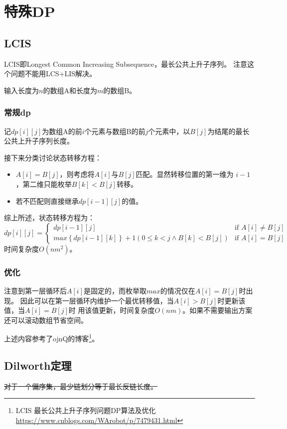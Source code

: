 \section{特殊DP}
\subsection{LCIS}
LCIS即Longest Common Increasing Subsequence，最长公共上升子序列。
注意这个问题不能用LCS+LIS解决。

输入长度为$n$的数组A和长度为$m$的数组B。
\subsubsection{常规dp}
记$dp[i][j]$为数组A的前$i$个元素与数组B的前$j$个元素中，以$B[j]$为结尾的最长
公共上升子序列长度。

接下来分类讨论状态转移方程：
\begin{itemize}
    \item $A[i]=B[j]$，则考虑将$A[i]$与$B[j]$匹配。显然转移位置的第一维为
    $i-1$，第二维只能枚举$B[k]<B[j]$转移。
    \item 若不匹配则直接继承$dp[i-1][j]$的值。
\end{itemize}

综上所述，状态转移方程为：
\begin{displaymath}
    dp[i][j]=\left\{\begin{array}{lr}
        dp[i-1][j]&\textrm{if~}A[i]\neq B[j]\\
        max\left\{dp[i-1][k]\right\}+1 (0\leq k <j \wedge B[k]<B[j])&
        \textrm{if~}A[i]=B[j]
    \end{array}\right.
\end{displaymath}
时间复杂度$O(nm^2)$。
\subsubsection{优化}
注意到第一层循环后$A[i]$是固定的，而枚举取$max$的情况仅在$A[i]=B[j]$时出现。
因此可以在第一层循环内维护一个最优转移值，当$A[i]>B[j]$时更新该值，当$A[i]=B[j]$时
用该值更新，时间复杂度$O(nm)$。如果不需要输出方案还可以滚动数组节省空间。

上述内容参考了ojnQ的博客\footnote{
    LCIS 最长公共上升子序列问题DP算法及优化
    \url{https://www.cnblogs.com/WArobot/p/7479431.html}
}。
\subsection{Dilworth定理}
\sout{对于一个偏序集，最少链划分等于最长反链长度。}

